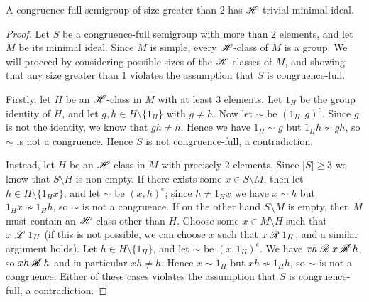 \begin{lemma}
  \label{lem:m-is-h-trivial}
  A congruence-full semigroup of size greater than $2$ has $\mathrel{\mathscr{H}}$-trivial
  minimal ideal.
  \begin{proof}
    Let $S$ be a congruence-full semigroup with more than $2$ elements, and let
    $M$ be its minimal ideal.  Since $M$ is simple, every $\mathrel{\mathscr{H}}$-class of $M$ is
    a group.  We will proceed by considering possible sizes of the $\mathrel{\mathscr{H}}$-classes
    of $M$, and showing that any size greater than $1$ violates the assumption
    that $S$ is congruence-full.

    Firstly, let $H$ be an $\mathrel{\mathscr{H}}$-class in $M$ with at least $3$ elements.  Let
    $1_H$ be the group identity of $H$, and let $g,h \in H\setminus\{1_H\}$
    with $g \neq h$.  Now let $\sim$ be $(1_H, g)^e$.  Since $g$ is not the
    identity, we know that $gh \neq h$.  Hence we have $1_H \sim g$ but
    $1_H h \nsim gh$, so $\sim$ is not a congruence.  Hence $S$ is not
    congruence-full, a contradiction.

    Instead, let $H$ be an $\mathrel{\mathscr{H}}$-class in $M$ with precisely $2$ elements.
    Since $|S| \geq 3$ we know that $S \setminus H$ is non-empty.  If there
    exists some $x \in S \setminus M$, then let $h \in H \setminus \{1_H x\}$,
    and let $\sim$ be $(x,h)^e$; since $h \neq 1_H x$ we have $x \sim h$ but
    $1_H x \nsim 1_H h$, so $\sim$ is not a congruence.  If on the other hand
    $S \setminus M$ is empty, then $M$ must contain an $\mathrel{\mathscr{H}}$-class other than
    $H$.  Choose some $x \in M \setminus H$ such that $x \mathrel{\mathscr{L}} 1_H$ (if this is
    not possible, we can choose $x$ such that $x \mathrel{\mathscr{R}} 1_H$, and a similar
    argument holds).  Let $h \in H \setminus \{1_H\}$, and let $\sim$ be
    $(x,1_H)^e$.  We have $xh \mathrel{\mathscr{R}} x \mathrel{\cancel{\mathscr{R}}} h$, so $xh \mathrel{\cancel{\mathscr{R}}} h$ and in particular
    $xh \neq h$.  Hence $x \sim 1_H$ but $xh \nsim 1_H h$, so $\sim$ is
    not a congruence.  Either of these cases violates the assumption that $S$
    is congruence-full, a contradiction.
  \end{proof}
\end{lemma}

